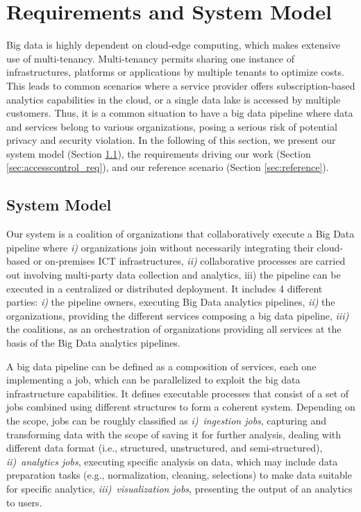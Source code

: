 \section{Requirements and System Model}\label{sec:requirements}
Big data is highly dependent on cloud-edge computing, which makes extensive use of mul\-ti-te\-nan\-cy. Mul\-ti-te\-nan\-cy permits sharing one instance of infrastructures, platforms or applications by multiple tenants to optimize costs. This leads to common scenarios where a service provider offers subscription-based analytics capabilities in the cloud, or a single data lake is accessed by multiple customers. Thus, it is a common situation to have a big data pipeline where data and services belong to various organizations, posing a serious risk of potential privacy and security violation. In the following of this section, we present our system model (Section \ref{sec:systemmodel}), the requirements driving our work (Section \ref{sec:accesscontrol_req}), and our reference scenario (Section \ref{sec:reference}).

\subsection{System Model}\label{sec:systemmodel}
Our system is a coalition of organizations that collaboratively execute a Big Data pipeline where \emph{i)} organizations join without necessarily integrating their cloud-based or on-premises ICT infrastructures, \emph{ii)} collaborative processes are carried out involving multi-party data collection and analytics, iii) the pipeline can be executed in a centralized or distributed deployment.
It includes 4 different parties: \emph{i)} the pipeline owners, executing Big Data analytics pipelines, \emph{ii)} the organizations, providing the different services composing a big data pipeline, \emph{iii)} the coalitions, as an orchestration of organizations providing all services at the basis of the Big Data analytics pipelines.

A big data pipeline can be defined as a composition of services, each one implementing a job, which can be parallelized to exploit the big data infrastructure capabilities. It defines executable processes that consist of a set of jobs combined using different structures to form a coherent system. Depending on the scope, jobs can be roughly classified as {\em i)}~\emph{ingestion jobs}, capturing and transforming data with the scope of saving it for further analysis, dealing with different data format (i.e., structured, unstructured, and semi-structured), {\em ii)}~\emph{analytics jobs}, executing specific analysis on data, which may include data preparation tasks (e.g., normalization, cleaning, selections) to make data suitable for specific analytics, {\em iii)~visualization jobs}, presenting the output of an analytics to users.

